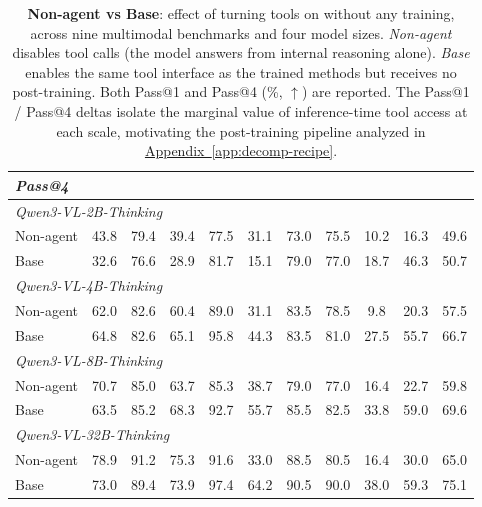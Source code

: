 \documentclass{llmxive}
\providecommand{\appref}[1]{\hyperref[#1]{Appendix~\ref*{#1}}}
\begin{document}
\begin{table}[t]
{\begin{tabular}{l ccc cccc cc >{\columncolor{mygray}}c}
        \multicolumn{11}{l}{\textit{Pass@4}} \\
        \midrule
        \multicolumn{11}{l}{\textit{Qwen3-VL-2B-Thinking}} \\
        Non-agent
            & 43.8 & 79.4 & 39.4 & 77.5 & 31.1 & 73.0 & 75.5 & 10.2 & 16.3 & 49.6 \\
        Base
            & 32.6 & 76.6 & 28.9 & 81.7 & 15.1 & 79.0 & 77.0 & 18.7 & 46.3 & 50.7 \\
        \midrule
        \multicolumn{11}{l}{\textit{Qwen3-VL-4B-Thinking}} \\
        Non-agent
            & 62.0 & 82.6 & 60.4 & 89.0 & 31.1 & 83.5 & 78.5 & 9.8 & 20.3 & 57.5 \\
        Base
            & 64.8 & 82.6 & 65.1 & 95.8 & 44.3 & 83.5 & 81.0 & 27.5 & 55.7 & 66.7 \\
        \midrule
        \multicolumn{11}{l}{\textit{Qwen3-VL-8B-Thinking}} \\
        Non-agent
            & 70.7 & 85.0 & 63.7 & 85.3 & 38.7 & 79.0 & 77.0 & 16.4 & 22.7 & 59.8 \\
        Base
            & 63.5 & 85.2 & 68.3 & 92.7 & 55.7 & 85.5 & 82.5 & 33.8 & 59.0 & 69.6 \\
        \midrule
        \multicolumn{11}{l}{\textit{Qwen3-VL-32B-Thinking}} \\
        Non-agent
            & 78.9 & 91.2 & 75.3 & 91.6 & 33.0 & 88.5 & 80.5 & 16.4 & 30.0 & 65.0 \\
        Base
            & 73.0 & 89.4 & 73.9 & 97.4 & 64.2 & 90.5 & 90.0 & 38.0 & 59.3 & 75.1 \\

        \bottomrule
    \end{tabular}
    }
\vspace{-0.2in}
\caption{\textbf{Non-agent vs Base}: effect of turning tools on without any training, across nine multimodal benchmarks and four model sizes. \textit{Non-agent} disables tool calls (the model answers from internal reasoning alone). \textit{Base} enables the same tool interface as the trained methods but receives no post-training. Both Pass@1 and Pass@4 (\%, $\uparrow$) are reported. The Pass@1 / Pass@4 deltas isolate the marginal value of inference-time tool access at each scale, motivating the post-training pipeline analyzed in \appref{app:decomp-recipe}.}
\end{table}
\end{document}
